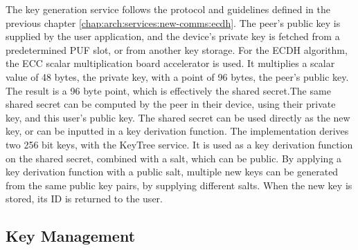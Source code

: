 The key generation service follows the protocol and guidelines defined in the previous chapter \ref{chap:arch:services:new-comms:ecdh}.
The peer's public key is supplied by the user application, and the device's private key is fetched from a predetermined PUF slot, or from another key storage.
For the \ac{ECDH} algorithm, the ECC scalar multiplication board accelerator is used. It multiplies a scalar value of 48 bytes, the private key, with a point of 96 bytes, the peer's public key. The result is a 96 byte point, which is effectively the shared secret.The same shared secret can be computed by the peer in their device, using their private key, and this user's public key.
The shared secret can be used directly as the new key, or can be inputted in a key derivation function.
The implementation derives two 256 bit keys, with the KeyTree service. It is used as a key derivation function on the shared secret, combined with a salt, which can be public.
By applying a key derivation function with a public salt, multiple new keys can be generated from the same public key pairs, by supplying different salts. 
When the new key is stored, its ID is returned to the user.

\subsection{Key Management}\label{chap:implementation:services:key-import}

